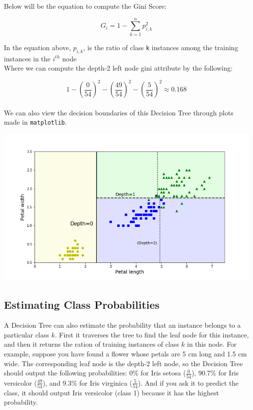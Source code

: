 \noindent
Below will be the equation to compute the Gini Score:

$$G_{i} = 1 - \sum_{k=1}^{n} p_{i,k}^{2}$$

\noindent
In the equation above, $p_{i,k}$, is the ratio of class \texttt{k} instances among the training instances in the 
$i^{th}$ node \\

\noindent
Where we can compute the depth-2 left node gini attribute by the following: 

$$1 - \left(\frac{0}{54}\right)^{2} - \left(\frac{49}{54}\right)^{2} - \left(\frac{5}{54}\right)^{2} \approx 0.168$$ \\

\noindent
We can also view the decision boundaries of this Decision Tree through plots made in \texttt{matplotlib}. 

\begin{center}
\includegraphics[scale=0.45]{Images/DecisionTreePlot.png}
\end{center}

\subsection{Estimating Class Probabilities}

A Decision Tree can also estimate the probability that an instance belongs to a particular class $k$. First it traverses the tree to find 
the leaf node for this instance, and then it returns the ration of training instances of class $k$ in this node. For example, suppose you 
have found a flower whose petals are 5 cm long and 1.5 cm wide. The corresponding leaf node is the depth-2 left node, so the Decision Tree 
should output the following probabilities: 0\% for Iris setosa ($\frac{0}{54}$), 90.7\% for Iris versicolor ($\frac{49}{54}$), and 9.3\% 
for Iris virginica ($\frac{5}{54}$). And if you ask it to predict the class, it should output Iris versicolor (class 1) because it has the 
highest probability. \\ 

